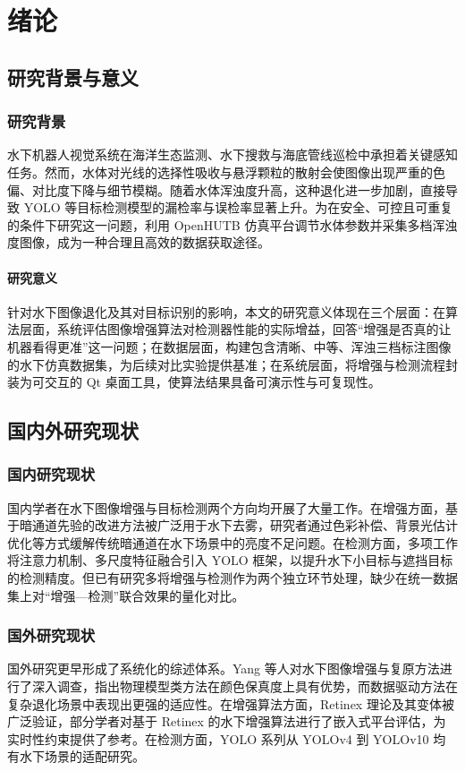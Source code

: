 \chapter{绪论}

\section{研究背景与意义}

\subsection{研究背景}
水下机器人视觉系统在海洋生态监测、水下搜救与海底管线巡检中承担着关键感知任务。然而，水体对光线的选择性吸收与悬浮颗粒的散射会使图像出现严重的色偏、对比度下降与细节模糊。随着水体浑浊度升高，这种退化进一步加剧，直接导致 YOLO 等目标检测模型的漏检率与误检率显著上升。为在安全、可控且可重复的条件下研究这一问题，利用 OpenHUTB 仿真平台调节水体参数并采集多档浑浊度图像，成为一种合理且高效的数据获取途径。

\subsubsection{研究意义}
针对水下图像退化及其对目标识别的影响，本文的研究意义体现在三个层面：在算法层面，系统评估图像增强算法对检测器性能的实际增益，回答“增强是否真的让机器看得更准”这一问题；在数据层面，构建包含清晰、中等、浑浊三档标注图像的水下仿真数据集，为后续对比实验提供基准；在系统层面，将增强与检测流程封装为可交互的 Qt 桌面工具，使算法结果具备可演示性与可复现性。

\section{国内外研究现状}

\subsection{国内研究现状}
国内学者在水下图像增强与目标检测两个方向均开展了大量工作。在增强方面，基于暗通道先验的改进方法被广泛用于水下去雾，研究者通过色彩补偿、背景光估计优化等方式缓解传统暗通道在水下场景中的亮度不足问题\cite{he2009}。在检测方面，多项工作将注意力机制、多尺度特征融合引入 YOLO 框架，以提升水下小目标与遮挡目标的检测精度。但已有研究多将增强与检测作为两个独立环节处理，缺少在统一数据集上对“增强—检测”联合效果的量化对比。

\subsection{国外研究现状}
国外研究更早形成了系统化的综述体系。Yang 等人对水下图像增强与复原方法进行了深入调查，指出物理模型类方法在颜色保真度上具有优势，而数据驱动方法在复杂退化场景中表现出更强的适应性\cite{yang2019}。在增强算法方面，Retinex 理论及其变体被广泛验证，部分学者对基于 Retinex 的水下增强算法进行了嵌入式平台评估，为实时性约束提供了参考\cite{olguin2022}。在检测方面，YOLO 系列从 YOLOv4 到 YOLOv10 均有水下场景的适配研究\cite{yolo2023}。

